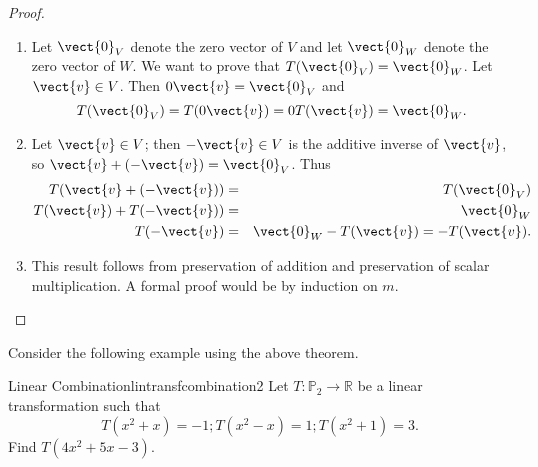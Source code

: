 \begin{proof}
\begin{enumerate}
\item Let $\vect{0}_V$ denote the zero vector of $V$ and let
$\vect{0}_W$ denote the zero vector of $W$.
We want to prove that $T(\vect{0}_V)=\vect{0}_W$.
Let $\vect{v}\in V$. 
Then $0\vect{v}=\vect{0}_V$ and
\[ T(\vect{0}_V)=T(0\vect{v})=0T(\vect{v})=\vect{0}_W.\]
\item
Let $\vect{v}\in V$; then $-\vect{v}\in V$ is the additive
inverse of $\vect{v}$, so $\vect{v} + (-\vect{v})=\vect{0}_V$.
Thus
\begin{eqnarray*}
T(\vect{v} + (-\vect{v})) & = & T(\vect{0}_V) \\
T(\vect{v}) + T(-\vect{v})) & = & \vect{0}_W \\
T(-\vect{v}) & = & \vect{0}_W - T(\vect{v}) =  - T(\vect{v}).
\end{eqnarray*}
\item This result follows from 
preservation of addition and preservation of scalar multiplication.
A formal proof would be by induction on $m$.
\end{enumerate}
\end{proof}

Consider the following example using the above theorem. 

\begin{example}{Linear Combination}{lintransfcombination2}
Let $T:\mathbb{P}_2 \to \mathbb{R}$ be a linear transformation such that
\[ T(x^2+x)=-1; T(x^2-x)=1; T(x^2+1)=3.\]
Find $T(4x^2+5x-3)$.
\end{example}

